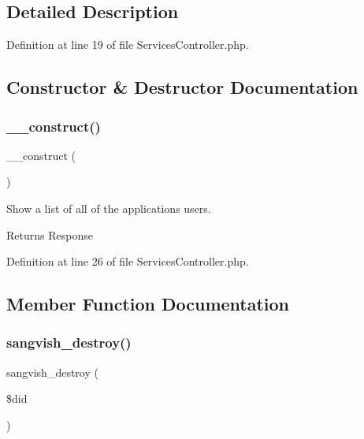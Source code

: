 \subsection{Detailed Description}


Definition at line 19 of file Services\+Controller.\+php.



\subsection{Constructor \& Destructor Documentation}
\mbox{\label{class_responsive_1_1_http_1_1_controllers_1_1_services_controller_a095c5d389db211932136b53f25f39685}} 
\subsubsection{\texorpdfstring{\_\_construct()}{\_\_construct()}}
{\footnotesize\ttfamily \+\_\+\+\_\+construct (\begin{DoxyParamCaption}{ }\end{DoxyParamCaption})}

Show a list of all of the application\textquotesingle{}s users.

\begin{DoxyReturn}{Returns}
Response 
\end{DoxyReturn}


Definition at line 26 of file Services\+Controller.\+php.



\subsection{Member Function Documentation}
\mbox{\label{class_responsive_1_1_http_1_1_controllers_1_1_services_controller_a4ef7021a71a781742edf692230b3626b}} 
\subsubsection{\texorpdfstring{sangvish\_destroy()}{sangvish\_destroy()}}
{\footnotesize\ttfamily sangvish\+\_\+destroy (\begin{DoxyParamCaption}\item[{}]{\$did }\end{DoxyParamCaption})}



